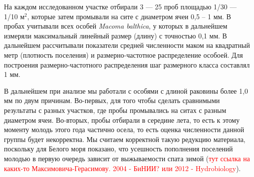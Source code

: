 \documentclass[12pt, a4paper]{article}
\begin{document}
На каждом исследованном участке отбирали 3 --- 25 проб площадью 1/30 --- 1/10 м$^2$, которые затем промывали на сите с диаметром ячеи 0,5 -- 1 мм. 
В пробах учитывали всех особей {\it Macoma balthica}, у которых в дальнейшем измеряли максимальный линейный размер (длину) с точностью 0,1 мм.
В дальнейшем рассчитывали показатели средней численности маком на квадратный метр (плотность поселения) и размерно-частотное распределение особоей.
Для построения размерно-частотного распределения шаг размерного класса составлял 1 мм.

В дальнейшем при анализе мы работали с особями с длиной раковины более 1,0 мм по двум причинам. 
Во-первых, для того чтобы сделать сравнимыми результаты с разных участков, где пробы промывались на ситах с разным диаметром ячеи. 
Во-вторых, пробы отбирали в середине лета, то есть к этому моменту молодь этого года частично осела, то есть оценка численности данной группы будет некорректна.
Мы считаем корректной такую редукцию материала, поскольку для Белого моря показано, что усешность пополнения поселений молодью в первую очередь зависит от выжываемости спата зимой (\textcolor{red}{тут ссылка на каких-то Максимовича-Герасимову. 2004 - БиНИИ? или 2012 - Hydrobiology}).





 



\end{document}
